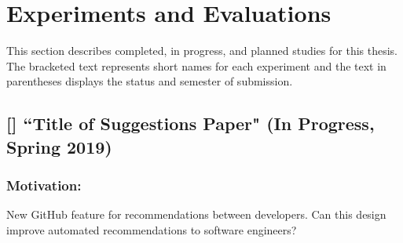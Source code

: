 \section{Experiments and Evaluations}

This section describes completed, in progress, and planned studies for this thesis. The bracketed text represents short names for each experiment and the text in parentheses displays the status and semester of submission.



\subsection{[\sugg] ``Title of Suggestions Paper" (In Progress, Spring 2019)}

\subsubsection{Motivation:} New GitHub feature for recommendations between developers. Can this design improve automated recommendations to software engineers?

